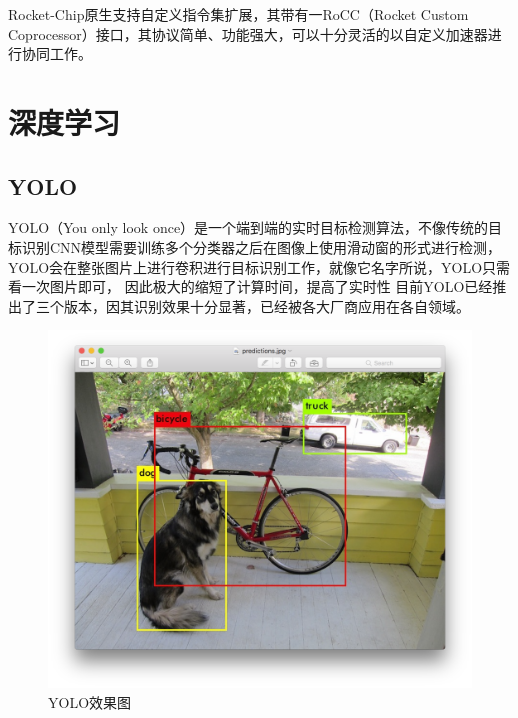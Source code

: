     Rocket-Chip原生支持自定义指令集扩展，其带有一RoCC（Rocket Custom Coprocessor）接口，其协议简单、功能强大，可以十分灵活的以自定义加速器进行协同工作。


\section{深度学习}
    \subsection{YOLO}
    YOLO（You only look once）是一个端到端的实时目标检测算法，不像传统的目标识别CNN模型需要训练多个分类器之后在图像上使用滑动窗的形式进行检测，YOLO会在整张图片上进行卷积进行目标识别工作，就像它名字所说，YOLO只需看一次图片即可，
    因此极大的缩短了计算时间，提高了实时性
    目前YOLO已经推出了三个版本，因其识别效果十分显著，已经被各大厂商应用在各自领域。
    \begin{figure}[h]
        \centering
        \includegraphics[scale=0.2]{../pdf/yolo.png}
        \caption{YOLO效果图}
        \label{}
    \end{figure}
